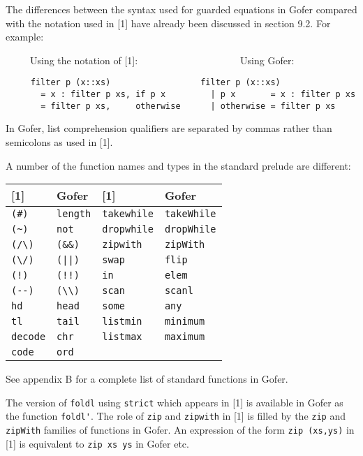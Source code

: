 \IT  The differences between the syntax used for  guarded equations  in
     Gofer compared with the notation used in  [1]  have  already  been
     discussed in section 9.2.  For example:

     ~~~~~Using the notation of [1]:~~~~~~~~~~~~~~~~~~~~~Using Gofer:
\begin{verbatim}
     filter p (x::xs)                  filter p (x::xs)
       = x : filter p xs, if p x         | p x       = x : filter p xs
       = filter p xs,     otherwise      | otherwise = filter p xs
\end{verbatim}
\IT  In Gofer,  list comprehension qualifiers  are separated by  commas
     rather than semicolons as used in [1].

\IT  A number of the  function names and types in the  standard prelude
     are different:
\BQ
\begin{tabular}{ll|ll}
  {[1]}          &    Gofer           & {[1]}            &  Gofer \\\hline
  \verb"(#)"     &    \verb"length"   & \verb"takewhile" &  \verb"takeWhile"\\
  \verb"(~)"     &    \verb"not"      & \verb"dropwhile" &  \verb"dropWhile"\\
  \verb"(/\)"    &    \verb"(&&)"     & \verb"zipwith"   &  \verb"zipWith"\\
  \verb"(\/)"    &    \verb"(||)"     & \verb"swap"      &  \verb"flip"\\
  \verb"(!)"     &    \verb"(!!)"     & \verb"in"        &  \verb"elem"\\
  \verb"(--)"    &    \verb"(\\)"     & \verb"scan"      &  \verb"scanl"\\
  \verb"hd"      &    \verb"head"     & \verb"some"      &  \verb"any"\\
  \verb"tl"      &    \verb"tail"     & \verb"listmin"   &  \verb"minimum"\\
  \verb"decode"  &    \verb"chr"      & \verb"listmax"   &  \verb"maximum"\\
  \verb"code"    &    \verb"ord"
\end{tabular}
\EQ
     See appendix B for a complete list of standard functions in Gofer.

     The version of \verb"foldl"  using  \verb"strict"  
     which  appears  in  [1]  is
     available in Gofer as the function \verb"foldl'".
     The role of \verb"zip" and \verb"zipwith" in [1] is 
     filled by the \verb"zip"  and
     \verb"zipWith" families of functions in Gofer.  An  expression  of  the
     form \verb"zip (xs,ys)" in [1] is equivalent to 
     \verb"zip xs ys"  in  Gofer
     etc.

